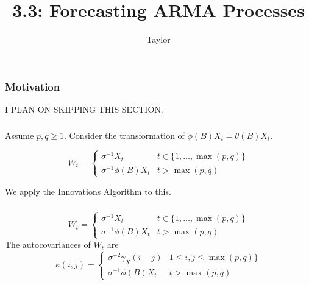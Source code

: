\documentclass{beamer}
\title["3.3"]{3.3: Forecasting ARMA Processes}
\author{Taylor}
\institute[UVA] 
{
University of Virginia \\
\medskip
\textit{} 
}
\date{}
\begin{document}

\begin{frame}
\titlepage 
\end{frame}


\begin{frame}
\frametitle{Motivation}

I PLAN ON SKIPPING THIS SECTION.
\end{frame}




\begin{frame}
\frametitle{}

Assume $p,q \ge 1$. Consider the transformation of $\phi(B)X_t = \theta(B)X_t$. 

\[
W_t = 
\begin{cases} 
  \sigma^{-1}X_t & t \in \{1, \ldots, \max(p,q) \} \\
  \sigma^{-1}\phi(B)X_t & t > \max(p,q) 
\end{cases}
\]

We apply the Innovations Algorithm to this.

\end{frame}


\begin{frame}
\frametitle{}

\[
W_t = 
\begin{cases} 
  \sigma^{-1}X_t & t \in \{1, \ldots, \max(p,q) \} \\
  \sigma^{-1}\phi(B)X_t & t > \max(p,q) 
\end{cases}
\]
The autocovariances of $W_t$ are 
\[
\kappa(i,j) = 
\begin{cases} 
  \sigma^{-2}\gamma_X(i-j) & 1 \le i,j \le \max(p,q) \} \\
  \sigma^{-1}\phi(B)X_t & t > \max(p,q) 
\end{cases}
\]


\end{frame}
\end{document}
